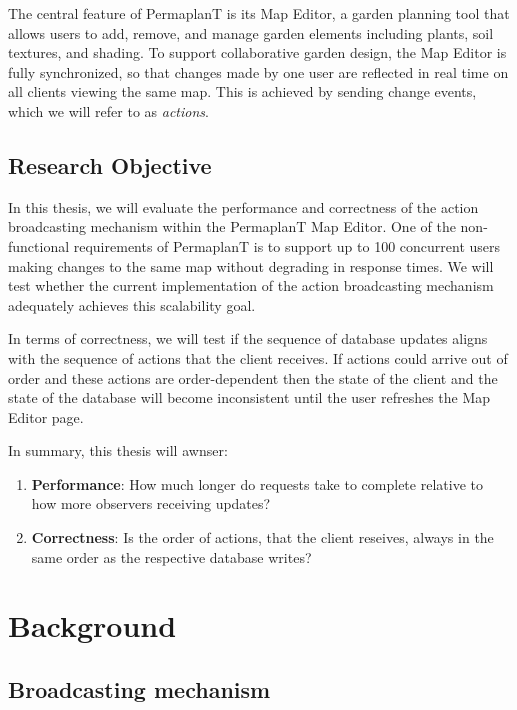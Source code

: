 \documentclass[final,draft,oneside]{vutinfth}
\begin{document}
The central feature of PermaplanT is its Map Editor, a garden planning tool that allows users to add, remove, and manage garden elements including plants, soil textures, and shading.
To support collaborative garden design, the Map Editor is fully synchronized, so that changes made by one user are reflected in real time on all clients viewing the same map. This is achieved by sending change events, which we will refer to as \emph{actions}.

\section{Research Objective}

In this thesis, we will evaluate the performance and correctness of the action broadcasting mechanism within the PermaplanT Map Editor.
One of the non-functional requirements of PermaplanT is to support up to 100 concurrent users making changes to the same map without degrading in response times.
We will test whether the current implementation of the action broadcasting mechanism adequately achieves this scalability goal.

In terms of correctness, we will test if the sequence of database updates aligns with the sequence of actions that the client receives.
If actions could arrive out of order and these actions are order-dependent then the state of the client and the state of the database will become inconsistent until the user refreshes the Map Editor page.

In summary, this thesis will awnser:
\begin{enumerate}
  \item \textbf{Performance}: How much longer do requests take to complete relative to how more observers receiving updates?
  \item \textbf{Correctness}: Is the order of actions, that the client reseives, always in the same order as the respective database writes? 
\end{enumerate}

\chapter{Background}

\section{Broadcasting mechanism}
\end{document}
